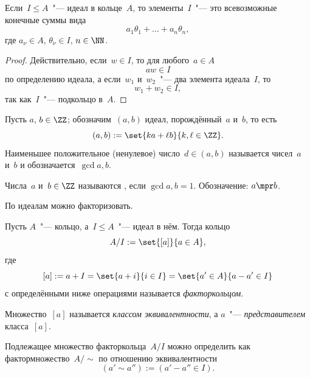 \begin{proposition}
	Если~$I \leq A$~"--- идеал в кольце~$A$, то элементы~$I$~"--- это всевозможные конечные суммы вида
	\[
		a_1 \theta_1 + \dots + a_n \theta_n,
	\]
	где $a_\nu \in A$, $\theta_\nu \in I$, $n \in \NN$.
\end{proposition}
\begin{proof}
	Действительно, если~$w \in I$, то для любого~$a \in A$
	\[
		aw \in I
	\]
	по определению идеала,
	а если~$w_1$ и~$w_2$~"--- два элемента идеала~$I$, то
	\[
		w_1 + w_2 \in I,
	\]
	так как~$I$~"--- подкольцо в~$A$.
\end{proof}

\begin{definition}
	Пусть $a$, $b \in \ZZ$; обозначим~$(a, b)$ идеал, порождённый~$a$ и~$b$, то есть
	\[
		(a, b) :=
		\set{ka + \ell b}{k, \ell \in \ZZ}
		.
	\]
	Наименьшее положительное (ненулевое) число~$d \in (a, b)$ называется  чисел~$a$ и~$b$ и обозначается~$\gcd{a, b}$.
\end{definition}

% 	



\begin{definition}
	Числа~$a$ и~$b \in \ZZ$ называются , если $\gcd{a, b} = 1$. Обозначение: $a \mpr b$.
\end{definition}

По идеалам можно факторизовать.

\begin{definition}
	Пусть $A$~"--- кольцо, а~$I \leq A$~"--- идеал в нём. Тогда кольцо
	\[
		A/I :=
		\set{[a]}{a \in A},
	\]
	где
	\[
		[a] := a + I =
		\set{a + i}{i \in I} =
		\set{a' \in A}{a - a' \in I}
	\]
	с определёнными ниже операциями называется \emph{факторкольцом}.

	Множество~$[a]$ называется \emph{классом эквивалентности}, а $a$~"--- \emph{представителем} класса~$[a]$.
\end{definition}

\begin{remark}
	Подлежащее множество факторкольца~$A/I$ можно определить как фактормножество~$A/\sim$ по отношению эквивалентности
	\[
		(a' \sim a'') :=
		(a' - a'' \in I)
		.
	\]
\end{remark}

